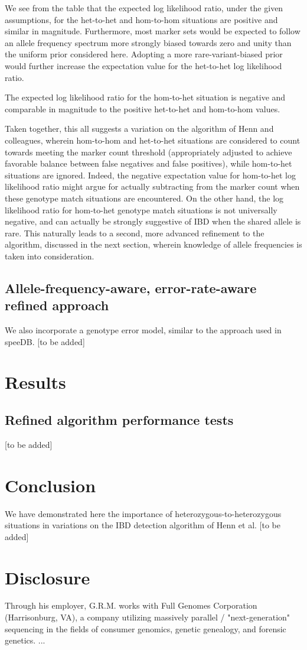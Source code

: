 \documentclass{article}
\begin{document}
We see from the table that the expected log likelihood ratio, under the given assumptions, for the het-to-het and hom-to-hom situations are positive and similar in magnitude. Furthermore, most marker sets would be expected to follow an allele frequency spectrum more strongly biased towards zero and unity than the uniform prior considered here. Adopting a more rare-variant-biased prior would further increase the expectation value for the het-to-het log likelihood ratio.

The expected log likelihood ratio for the hom-to-het situation is negative and comparable in magnitude to the positive het-to-het and hom-to-hom values.

Taken together, this all suggests a variation on the algorithm of Henn and colleagues, wherein hom-to-hom and het-to-het situations are considered to count towards meeting the marker count threshold (appropriately adjusted to achieve favorable balance between false negatives and false positives), while hom-to-het situations are ignored. Indeed, the negative expectation value for hom-to-het log likelihood ratio might argue for actually subtracting from the marker count when these genotype match situations are encountered. On the other hand, the log likelihood ratio for hom-to-het genotype match situations is not universally negative, and can actually be strongly suggestive of IBD when the shared allele is rare. This naturally leads to a second, more advanced refinement to the algorithm, discussed in the next section, wherein knowledge of allele frequencies is taken into consideration.

\subsection{Allele-frequency-aware, error-rate-aware refined approach}
We also incorporate a genotype error model, similar to the approach used in speeDB.\citep{speeDB}
[to be added]

\section{Results}
\subsection{Refined algorithm performance tests}
[to be added]

\section{Conclusion}
We have demonstrated here the importance of heterozygous-to-heterozygous situations in variations on the IBD detection algorithm of Henn et al. [to be added] 

\section{Disclosure}
Through his employer, G.R.M. works with Full Genomes Corporation (Harrisonburg, VA), a company utilizing massively parallel / "next-generation" sequencing in the fields of consumer genomics, genetic genealogy, and forensic genetics.
...



\end{document}
